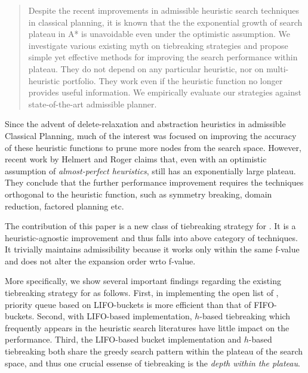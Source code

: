 \begin{abstract}
Despite the recent improvements in admissible heuristic search techniques
in classical planning, it is known that the the exponential growth of
search plateau in A* is unavoidable even under the optimistic assumption.
We investigate various existing myth on tiebreaking
 strategies and propose simple yet effective methods for improving the
 search performance within plateau.
 They do not depend on any particular heuristic, nor
 on multi-heuristic portfolio.
 They work even if the heuristic
 function no longer provides useful information.
 We empirically evaluate our strategies against state-of-the-art admissible planner.
\end{abstract}

Since the advent of delete-relaxation and abstraction heuristics in
admissible Classical Planning, much of the interest was focused on improving
the accuracy of these heuristic functions to prune more nodes from the
search space.
% 
However, recent work by Helmert and Roger
 claims that, even with an optimistic
assumption of \emph{almost-perfect heuristics}, \astar still has an
exponentially large plateau. They conclude that the further performance
improvement requires the techniques orthogonal to the heuristic
function, such as symmetry breaking, domain reduction, factored planning
etc.

The contribution of this paper is a new class of
tiebreaking strategy for \astar.
It is a heuristic-agnostic improvement and thus 
falls into above category of techniques.
It trivially maintains admissibility because it works only within the
same f-value and does not alter the expansion order wrto f-value.



More specifically, we show several important findings regarding the
existing tiebreaking strategy for \astar as follows.
% 
First, in implementing the open list of \astar, priority queue based on
LIFO-buckets is more efficient than that of FIFO-buckets.
% 
Second, with LIFO-based implementation, $h$-based tiebreaking which
frequently appears in the heuristic search literatures have little
impact on the performance.
% 
Third, the LIFO-based bucket implementation and $h$-based tiebreaking
both share the greedy search pattern within the plateau of the
search space, and thus one crucial essense of tiebreaking is the
\emph{depth within the plateau}.


